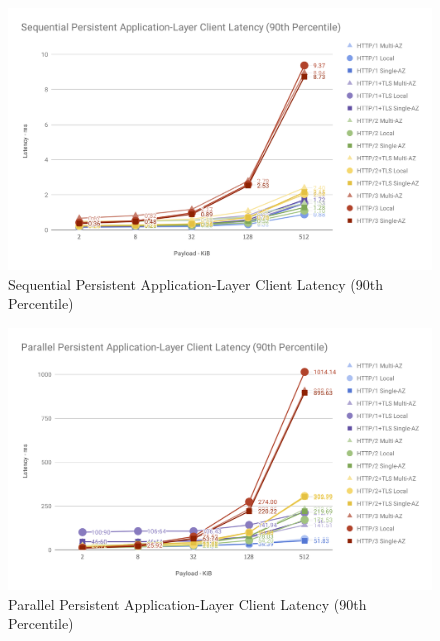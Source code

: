 \begin{figure}[h!]
    \centering
    \includegraphics[width=\linewidth]{figures/charts/Sequential Persistent Application-Layer Client Latency (90th Percentile).png}
    \caption{Sequential Persistent Application-Layer Client Latency (90th Percentile)}
    \label{fig:sequential_app_latency}
\end{figure}
\begin{figure}[h!]
    \centering
    \includegraphics[width=\linewidth]{figures/charts/Parallel Persistent Application-Layer Client Latency (90th Percentile).png}
    \caption{Parallel Persistent Application-Layer Client Latency (90th Percentile)}
    \label{fig:parallel_app_latency}
\end{figure}


